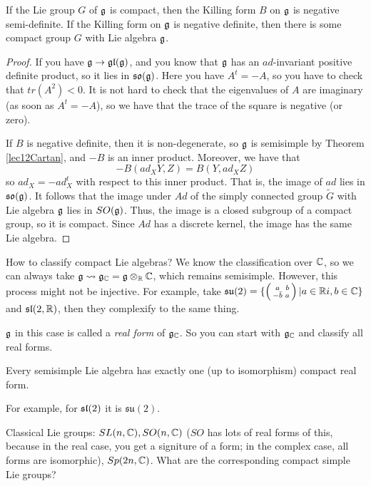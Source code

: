  \begin{theorem}
   If the Lie group $G$ of $\g$ is compact, then the Killing form $B$ on $\g$ is
   negative semi-definite. If the Killing form on $\g$ is negative definite, then
   there is some compact group $G$ with Lie algebra $\g$. 
 \end{theorem}
 \begin{proof}
   If you have $\g\to \gl(\g)$, and you know that $\g$ has an $ad$-invariant positive
   definite product, so it lies in $\so(\g)$. Here you have $A^t=-A$, so you have to
   check that $tr(A^2)< 0$. It is not hard to check that the eigenvalues of $A$ are
   imaginary (as soon as $A^t=-A$), so we have that the trace of the square is
   negative (or zero).

   If $B$ is negative definite, then it is non-degenerate, so $\g$ is semisimple by
   Theorem \ref{lec12Cartan}, and $-B$ is an inner product. Moreover, we have that
   \[
      -B(ad_X Y,Z) = B(Y,ad_X Z)
   \]
   so $ad_X = -ad_X^t$ with respect to this inner product. That is, the image of $ad$
   lies in $\so(\g)$. It follows that the image under $Ad$ of the simply connected
   group $\tilde G$ with Lie algebra $\g$ lies in $SO(\g)$. Thus, the image is a
   closed subgroup of a compact group, so it is compact. Since $Ad$ has a discrete
   kernel, the image has the same Lie algebra.
 \end{proof}


 How to classify compact Lie algebras?  We know the classification over $\CC$, so we
 can always take $\g\rightsquigarrow \g_\CC=\g\otimes_\RR \CC$, which remains
 semisimple. However, this process might not be injective. For example, take $\mathfrak{su}(2)
 = \{\matrix{a}{b}{-\bar b}{a}| a\in \RR i, b\in \CC\}$ and $\sl(2,\RR)$, then they
 complexify to the same thing.

 $\g$ in this case is called a \emph{real form} of $\g_\CC$. So you
 can start with $\g_\CC$ and classify all real forms.
 \begin{theorem}[Cartan]
   Every semisimple Lie algebra has exactly one (up to isomorphism) compact real
   form.
 \end{theorem}
 For example, for $\sl(2)$ it is $\mathfrak{su}(2)$.

 Classical Lie groups: $SL(n,\CC), SO(n,\CC)$ ($SO$ has lots of real forms of this,
because in the real case, you get a signiture of a form; in the complex case, all
forms are isomorphic), $Sp(2n,\CC)$. What are the corresponding compact simple Lie
groups?

